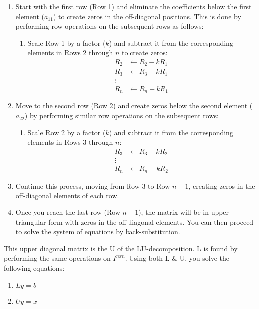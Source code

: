 \documentclass[12pt, letterpaper]{article}
\begin{document}
\begin{enumerate}
   \item Start with the first row (Row 1) and eliminate the coefficients below the first element ($a_{11}$) to create zeros in the off-diagonal positions. This is done by performing row operations on the subsequent rows as follows:
   \begin{enumerate}
       \item Scale Row 1 by a factor ($k$) and subtract it from the corresponding elements in Rows 2 through $n$ to create zeros:
       \[
       \begin{aligned}
           R_2 &\leftarrow R_2 - kR_1 \\
           R_3 &\leftarrow R_3 - kR_1 \\
           \vdots \\
           R_n &\leftarrow R_n - kR_1
       \end{aligned}
       \]
   \end{enumerate}

   \item Move to the second row (Row 2) and create zeros below the second element ($a_{22}$) by performing similar row operations on the subsequent rows:
   \begin{enumerate}
       \item Scale Row 2 by a factor ($k$) and subtract it from the corresponding elements in Rows 3 through $n$:
       \[
       \begin{aligned}
           R_3 &\leftarrow R_3 - kR_2 \\
           \vdots \\
           R_n &\leftarrow R_n - kR_2
       \end{aligned}
       \]
   \end{enumerate}
   \item Continue this process, moving from Row 3 to Row $n-1$, creating zeros in the off-diagonal elements of each row.

    \item Once you reach the last row (Row $n-1$), the matrix will be in upper triangular form with zeros in the off-diagonal elements. You can then proceed to solve the system of equations by back-substitution.


\end{enumerate}

This upper diagonal matrix is the U of the LU-decomposition. L is found by performing the same operations on $I^{nxn}$. Using both L $\&$ U, you solve the following equations:
\begin{enumerate}
   \item $Ly=b$
   \item $Uy=x$
\end{enumerate}
\end{document}
